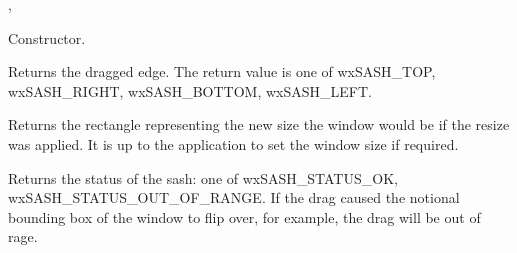 
,\rtfsp
{}




Constructor.

\label{wxsasheventgetedge}


Returns the dragged edge. The return value is one of wxSASH\_TOP, wxSASH\_RIGHT, wxSASH\_BOTTOM, wxSASH\_LEFT.

\label{wxsasheventgetdragrect}


Returns the rectangle representing the new size the window would be if the resize was applied. It is
up to the application to set the window size if required.

\label{wxsasheventgetdragstatus}


Returns the status of the sash: one of wxSASH\_STATUS\_OK, wxSASH\_STATUS\_OUT\_OF\_RANGE.
If the drag caused the notional bounding box of the window to flip over, for example, the drag will be out of rage.


